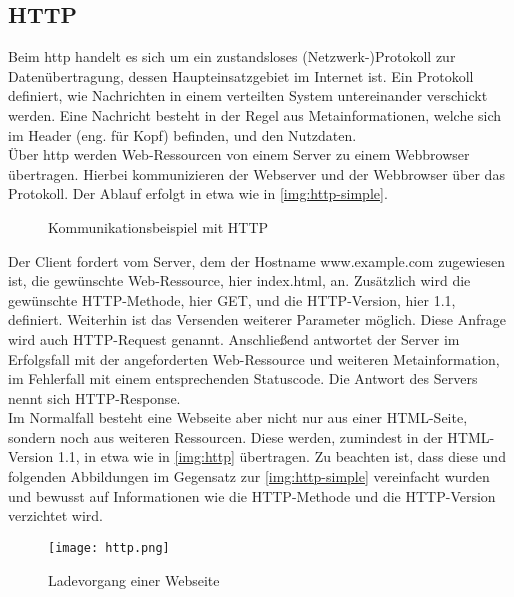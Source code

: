 \subsection{HTTP}
\label{sec:http}

Beim \ac{http} handelt es sich um ein zustandsloses (Netzwerk-)Protokoll zur Datenübertragung, dessen Haupteinsatzgebiet im Internet ist. Ein Protokoll definiert, wie Nachrichten in einem verteilten System untereinander verschickt werden. Eine Nachricht besteht in der Regel aus Metainformationen, welche sich im Header (eng. für Kopf) befinden, und den Nutzdaten.\\
Über \ac{http} werden Web-Ressourcen von einem Server zu einem Webbrowser übertragen. Hierbei kommunizieren der Webserver und der Webbrowser über das Protokoll. Der Ablauf erfolgt in etwa wie in \autoref{img:http-simple}.

\begin{figure}[H]
	\begin{center}
		
		\caption{Kommunikationsbeispiel mit HTTP}
		\label{img:http-simple}
	\end{center}
\end{figure}


Der Client fordert vom Server, dem der Hostname www.example.com zugewiesen ist, die gewünschte Web-Ressource, hier index.html, an. Zusätzlich wird die gewünschte HTTP-Methode, hier GET, und die HTTP-Version, hier 1.1, definiert. Weiterhin ist das Versenden weiterer Parameter möglich. Diese Anfrage wird auch HTTP-Request genannt. Anschließend antwortet der Server im Erfolgsfall mit der angeforderten Web-Ressource und weiteren Metainformation, im Fehlerfall mit einem entsprechenden Statuscode. Die Antwort des Servers nennt sich HTTP-Response.\\
Im Normalfall besteht eine Webseite aber nicht nur aus einer HTML-Seite, sondern noch aus weiteren Ressourcen. Diese werden, zumindest in der HTML-Version 1.1, in etwa wie in \autoref{img:http} übertragen. Zu beachten ist, dass diese und folgenden Abbildungen im Gegensatz zur \autoref{img:http-simple} vereinfacht wurden und bewusst auf Informationen wie die HTTP-Methode und die HTTP-Version verzichtet wird.

\begin{figure}[H]
	\begin{center}
		\texttt{[image: http.png]}
		\caption{Ladevorgang einer Webseite}
		\label{img:http}
	\end{center}
\end{figure}

